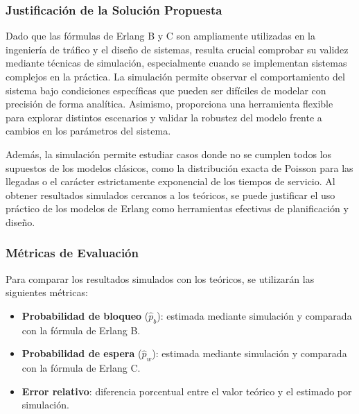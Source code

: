 \documentclass{article}
\begin{document}
\subsubsection{Justificación de la Solución Propuesta}

Dado que las fórmulas de Erlang B y C son ampliamente utilizadas en la ingeniería de tráfico y el diseño de sistemas, resulta crucial comprobar su validez mediante técnicas de simulación, especialmente cuando se implementan sistemas complejos en la práctica. La simulación permite observar el comportamiento del sistema bajo condiciones específicas que pueden ser difíciles de modelar con precisión de forma analítica. Asimismo, proporciona una herramienta flexible para explorar distintos escenarios y validar la robustez del modelo frente a cambios en los parámetros del sistema.

Además, la simulación permite estudiar casos donde no se cumplen todos los supuestos de los modelos clásicos, como la distribución exacta de Poisson para las llegadas o el carácter estrictamente exponencial de los tiempos de servicio. Al obtener resultados simulados cercanos a los teóricos, se puede justificar el uso práctico de los modelos de Erlang como herramientas efectivas de planificación y diseño.

\subsubsection{Métricas de Evaluación}

Para comparar los resultados simulados con los teóricos, se utilizarán las siguientes métricas:

\begin{itemize}
    \item \textbf{Probabilidad de bloqueo} ($\hat{p}_b$): estimada mediante simulación y comparada con la fórmula de Erlang B.
    \item \textbf{Probabilidad de espera} ($\hat{p}_w$): estimada mediante simulación y comparada con la fórmula de Erlang C.
    \item \textbf{Error relativo}: diferencia porcentual entre el valor teórico y el estimado por simulación.
\end{itemize}



\end{document}
